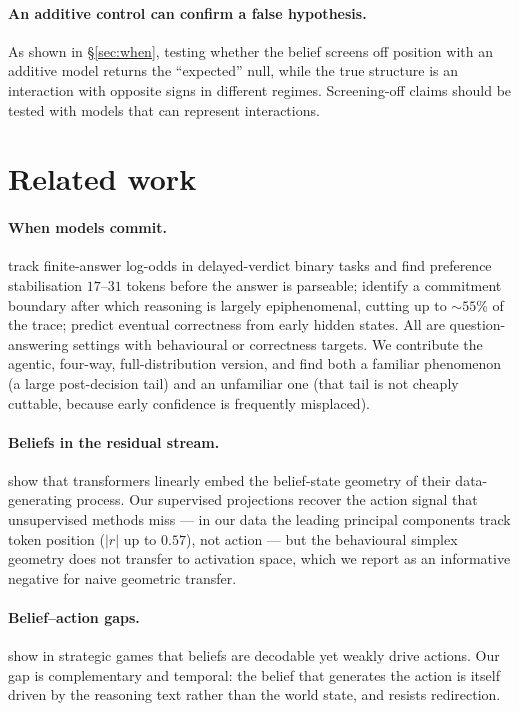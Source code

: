 \documentclass{article}
\begin{document}
\paragraph{An additive control can confirm a false hypothesis.} As shown in
\S\ref{sec:when}, testing whether the belief screens off position with an additive model
returns the ``expected'' null, while the true structure is an interaction with opposite
signs in different regimes. Screening-off claims should be tested with models that can
represent interactions.

\section{Related work}

\paragraph{When models commit.} \citet{commit2026} track finite-answer log-odds in
delayed-verdict binary tasks and find preference stabilisation $17$--$31$ tokens before the
answer is parseable; \citet{boundary2026} identify a commitment boundary after which
reasoning is largely epiphenomenal, cutting up to ${\sim}55\%$ of the trace;
\citet{temporal2025} predict eventual correctness from early hidden states. All are
question-answering settings with behavioural or correctness targets. We contribute the
agentic, four-way, full-distribution version, and find both a familiar phenomenon (a large
post-decision tail) and an unfamiliar one (that tail is not cheaply cuttable, because early
confidence is frequently misplaced).

\paragraph{Beliefs in the residual stream.} \citet{shai2024} show that transformers
linearly embed the belief-state geometry of their data-generating process. Our supervised
projections recover the action signal that unsupervised methods miss --- in our data the
leading principal components track token position ($|r|$ up to $0.57$), not action --- but
the behavioural simplex geometry does not transfer to activation space, which we report as
an informative negative for naive geometric transfer.

\paragraph{Belief--action gaps.} \citet{broken2026} show in strategic games that beliefs
are decodable yet weakly drive actions. Our gap is complementary and temporal: the belief
that generates the action is itself driven by the reasoning text rather than the world
state, and resists redirection.
\end{document}
